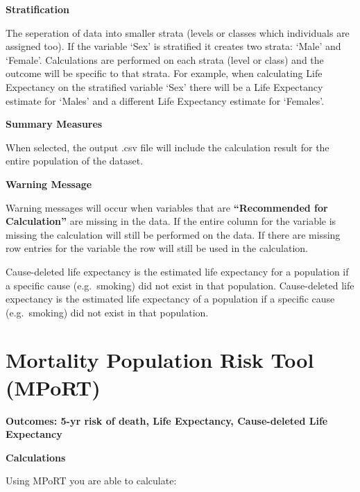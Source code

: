 \documentclass[]{book}
\begin{document}
\textbf{Stratification}

The seperation of data into smaller strata (levels or
classes which individuals are assigned too). If the variable `Sex' is
stratified it creates two strata: `Male' and `Female'. Calculations are
performed on each strata (level or class) and the outcome will be
specific to that strata. For example, when calculating Life Expectancy
on the stratified variable `Sex' there will be a Life Expectancy
estimate for `Males' and a different Life Expectancy estimate for
`Females'.

\textbf{Summary Measures}

When selected, the output .csv file will include the calculation result
for the entire population of the dataset.

\textbf{Warning Message}

Warning messages will occur when variables that are
\textbf{``Recommended for Calculation''} are missing in the data. If the
entire column for the variable is missing the calculation will still be
performed on the data. If there are missing row entries for the variable
the row will still be used in the calculation.

Cause-deleted life expectancy is the estimated life
expectancy for a population if a specific cause (e.g.~smoking) did not
exist in that population. Cause-deleted life expectancy is the estimated life
expectancy of a population if a specific cause (e.g.~smoking) did not
exist in that population.





















\appendix


\chapter{Mortality Population Risk Tool
(MPoRT)}\label{mortality-population-risk-tool-mport}

\textbf{Outcomes: 5-yr risk of death, Life Expectancy, Cause-deleted
Life Expectancy}

\textbf{Calculations}

Using MPoRT you are able to calculate:
\end{document}
